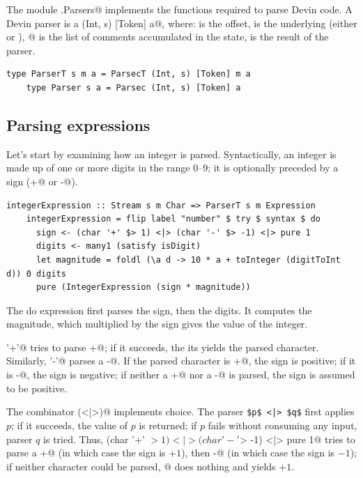 \documentclass[UdineBachThesis,american,11pt]{PhdThesis}
\begin{document}
  \newpage

  The module \lstinline@Devin.Parsers@ implements the functions required to
  parse Devin code. A Devin parser is a \lstinline@Parsec (Int, s) [Token] a@,
  where: \lstinline@Int@ is the offset, \lstinline@s@ is the underlying
  \lstinline@Steam@ (either \lstinline@String@ or \lstinline@Text@),
  \lstinline@[Token]@ is the list of comments accumulated in the state,
  \lstinline@a@ is the result of the parser.

  \begin{lstlisting}[gobble=4,basicstyle=\ttfamily\small]
    type ParserT s m a = ParsecT (Int, s) [Token] m a
    type Parser s a = Parsec (Int, s) [Token] a
  \end{lstlisting}

  \subsection{Parsing expressions}

  Let's start by examining how an integer is parsed. Syntactically, an integer
  is made up of one or more digits in the range $0$--$9$; it is optionally
  preceded by a sign (\lstinline@+@ or \lstinline@-@).

  \begin{lstlisting}[gobble=4,basicstyle=\ttfamily\small]
    integerExpression :: Stream s m Char => ParserT s m Expression
    integerExpression = flip label "number" $ try $ syntax $ do
      sign <- (char '+' $> 1) <|> (char '-' $> -1) <|> pure 1
      digits <- many1 (satisfy isDigit)
      let magnitude = foldl (\a d -> 10 * a + toInteger (digitToInt d)) 0 digits
      pure (IntegerExpression (sign * magnitude))
  \end{lstlisting}

  The do expression first parses the sign, then the digits. It computes the
  magnitude, which multiplied by the sign gives the value of the integer.

  \lstinline@char '+'@ tries to parse \lstinline@+@; if it succeeds, the its
  yields the parsed character. Similarly, \lstinline@char '-'@ parses a
  \lstinline@-@. If the parsed character is \lstinline@+@, the sign is positive;
  if it is \lstinline@-@, the sign is negative; if neither a \lstinline@+@ nor a
  \lstinline@-@ is parsed, the sign is assumed to be positive.

  The combinator \lstinline@(<|>)@ implements choice. The parser
  \lstinline[mathescape]@$p$ <|> $q$@ first applies $p$; if it succeeds, the
  value of $p$ is returned; if $p$ fails without consuming any input, parser $q$
  is tried. Thus, \lstinline@(char '+' $> 1) <|> (char '-' $> -1) <|> pure 1@
  tries to parse a \lstinline@+@ (in which case the sign is $+1$), then
  \lstinline@-@ (in which case the sign is $-1$); if neither character could be
  parsed, @ does nothing and yields $+1$.
\end{document}
